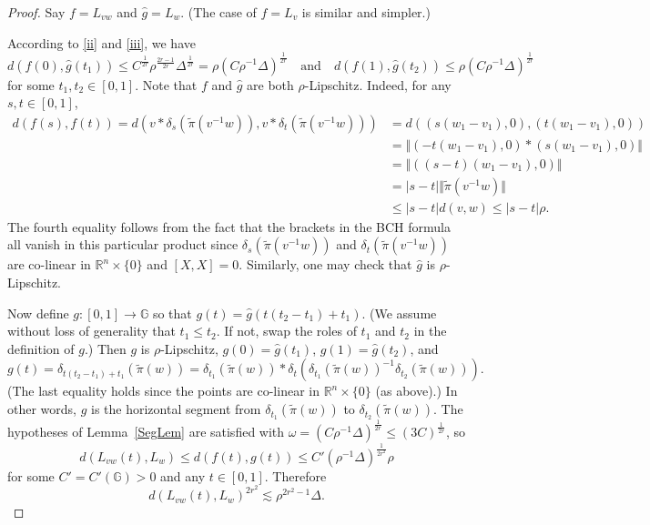 \documentclass[11pt]{amsart}
\theoremstyle{definition}
\numberwithin{theorem}{section} \numberwithin{equation}{section}
\begin{document}
\begin{proof}
Say $f = L_{vw}$ and $\hat{g} = L_w$.
(The case of $f = L_v$ is similar and simpler.)

According to \eqref{ii} and \eqref{iii}, we have
$$
d(f(0),\hat{g}(t_1)) \leq C^{\frac{1}{2r}} \rho^{\frac{2r-1}{2r}} \Delta^{\frac{1}{2r}} = \rho(C\rho^{-1}\Delta)^{\frac{1}{2r}}
\quad \text{and} \quad
d(f(1),\hat{g}(t_2)) 
\leq %
\rho(C\rho^{-1}\Delta)^{\frac{1}{2r}}
$$
for some $t_1,t_2 \in [0,1]$.
Note that $f$ and $\hat{g}$ are both $\rho$-Lipschitz.
Indeed, for any $s,t \in [0,1]$,
\begin{align*}
d(f(s),f(t)) = d(v*\delta_s(\tilde{\pi}(v^{-1}w)),v*\delta_t(\tilde{\pi}(v^{-1}w))) 
&= d((s(w_1-v_1),0),(t(w_1-v_1),0)) \\
&= \Vert (-t(w_1-v_1),0) * (s(w_1-v_1),0) \Vert \\
&= \Vert ((s-t)(w_1-v_1),0) \Vert \\
&= |s-t| \Vert \tilde{\pi}(v^{-1}w) \Vert  \\
&\leq |s-t| d(v,w) \leq |s-t| \rho.
\end{align*}
The fourth equality follows from the fact that 
the brackets in the BCH formula all vanish in this particular product since 
$\delta_s(\tilde{\pi}(v^{-1}w))$ and $\delta_t(\tilde{\pi}(v^{-1}w))$
are co-linear in $\mathbb{R}^n \times \{0\}$
and $[X,X]=0$.
Similarly, one may check that $\hat{g}$ is $\rho$-Lipschitz.

Now define $g:[0,1] \to \mathbb{G}$ so that $g(t) = \hat{g}(t(t_2-t_1) + t_1)$.
(We assume without loss of generality that $t_1 \leq t_2$.
If not, swap the roles of $t_1$ and $t_2$ in the definition of $g$.)
Then $g$ is $\rho$-Lipschitz, $g(0) = \hat{g}(t_1)$, $g(1) = \hat{g}(t_2)$, and
$$
g(t) 
= \delta_{t(t_2-t_1) + t_1}(\tilde{\pi}(w))
=\delta_{t_1}(\tilde{\pi}(w)) * \delta_t( \delta_{t_1}(\tilde{\pi}(w))^{-1} \delta_{t_2}(\tilde{\pi}(w)) ).
$$
(The last equality holds since the points are co-linear in $\mathbb{R}^n \times \{ 0 \}$ (as above).)
In other words, $g$ is the horizontal segment from $\delta_{t_1}(\tilde{\pi}(w))$ to $\delta_{t_2}(\tilde{\pi}(w))$.
The hypotheses of Lemma~\ref{SegLem} are satisfied with $\omega = (C\rho^{-1}\Delta)^{\frac{1}{2r}} \leq (3C)^{\frac{1}{2r}}$,
so 
$$
d(L_{vw}(t),L_w) \leq d(f(t),g(t)) \leq C' (\rho^{-1}\Delta)^{\frac{1}{2r^2}} \rho
$$
for some $C'=C'(\mathbb{G})>0$ and any $t \in [0,1]$.
Therefore
$$
d(L_{vw}(t),L_w)^{2r^2} \lesssim \rho^{2r^2 - 1} \Delta.
$$
\end{proof}
\end{document}
